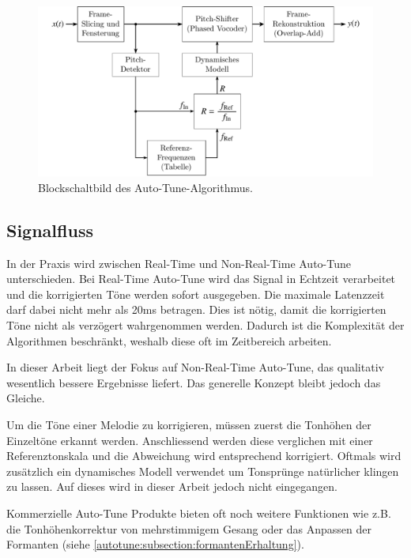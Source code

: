 \begin{figure}
	\centering
	\includegraphics[width=\textwidth]{papers/autotune/images/Blockdiagram.pdf}
	\caption{Blockschaltbild des Auto-Tune-Algorithmus.}
    \label{autotune:fig:blockschaltbild}
\end{figure}


\subsection{Signalfluss}
\label{autotune:subsection:signalfluss}
In der Praxis wird zwischen Real-Time und Non-Real-Time Auto-Tune unterschieden.
Bei Real-Time Auto-Tune wird das Signal in Echtzeit verarbeitet und die korrigierten Töne werden sofort ausgegeben.
Die maximale Latenzzeit darf dabei nicht mehr als 20\;ms betragen.
Dies ist nötig, damit die korrigierten Töne nicht als verzögert wahrgenommen werden.
Dadurch ist die Komplexität der Algorithmen beschränkt, weshalb diese oft im Zeitbereich arbeiten.

In dieser Arbeit liegt der Fokus auf Non-Real-Time Auto-Tune, das qualitativ wesentlich bessere Ergebnisse liefert.
Das generelle Konzept bleibt jedoch das Gleiche.

Um die Töne einer Melodie zu korrigieren, müssen zuerst die Tonhöhen der Einzeltöne erkannt werden.
Anschliessend werden diese verglichen mit einer Referenztonskala und die Abweichung wird entsprechend korrigiert.
Oftmals wird zusätzlich ein dynamisches Modell verwendet um Tonsprünge natürlicher klingen zu lassen.
Auf dieses wird in dieser Arbeit jedoch nicht eingegangen.

Kommerzielle Auto-Tune Produkte bieten oft noch weitere Funktionen wie z.B. die Tonhöhenkorrektur von mehrstimmigem Gesang oder das Anpassen der Formanten (siehe \ref{autotune:subsection:formantenErhaltung}).

